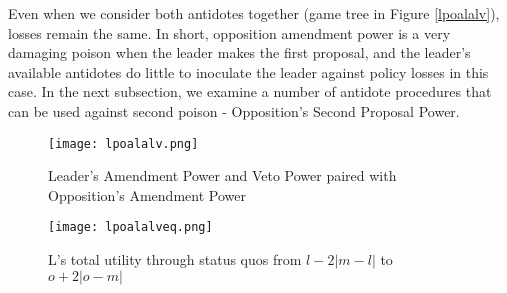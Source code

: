 \documentclass[12pt]{article}
\theoremstyle{plain}		      \newtheorem{assn}{Assumption}
\theoremstyle{plain}		      \newtheorem{prop}{Proposition}
\theoremstyle{plain}		      \newtheorem{lemma}{Lemma}
\theoremstyle{plain}	          \newtheorem{imp}{Implication}
\theoremstyle{plain}	          \newtheorem{hyp}{Hypothesis}
\theoremstyle{definition}		  \newtheorem{defn}{Definition}
\theoremstyle{remark}	          \newtheorem{rem}{Remark}
\theoremstyle{definition}         \newtheorem{case}{Case}
\begin{document}
\indent Even when we consider both antidotes together (game tree in Figure \ref{lpoalalv}), losses remain the same. In short, opposition amendment power is a very damaging poison when the leader makes the first proposal, and the leader's available antidotes do little to inoculate the leader against policy losses in this case. In the next subsection, we examine a number of antidote procedures that can be used against second poison - Opposition's Second Proposal Power.
\begin{figure}[h]
  \centering
  \begin{minipage}[b]{0.3\textwidth}
    \texttt{[image: lpoalalv.png]}
    \caption{Leader's Amendment Power and Veto Power paired with Opposition's Amendment Power}
    \label{lpoalalv}
  \end{minipage}
  \hfill
  \begin{minipage}[b]{0.6\textwidth}
    \texttt{[image: lpoalalveq.png]}
    \caption{L's total utility through status quos \newline from $l-2|m-l|$ to $o+2|o-m|$}
    \label{lpoalalveq}
  \end{minipage}
\end{figure}
\FloatBarrier
\end{document}
